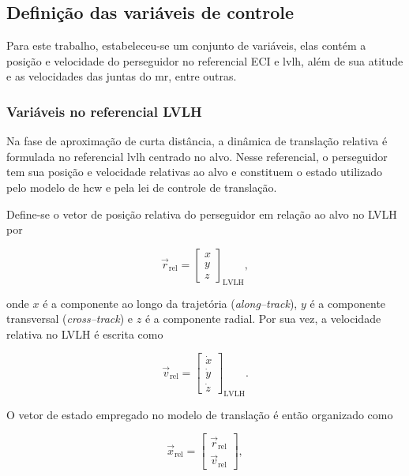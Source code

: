 \subsection{Definição das variáveis de controle}
\label{sec:var_controle}

Para este trabalho, estabeleceu-se um conjunto de variáveis, elas contém a posição e velocidade do perseguidor no referencial ECI e \gls{lvlh}, além de sua atitude e as velocidades das juntas do \gls{mr}, entre outras.

\subsubsection{Variáveis no referencial LVLH}
\label{sec:var_ref_lvlh}

Na fase de aproximação de curta distância, a dinâmica de translação relativa é formulada no referencial \gls{lvlh} centrado no alvo.
Nesse referencial, o perseguidor tem sua posição e velocidade relativas ao alvo e constituem o estado utilizado pelo modelo de \gls{hcw} e pela lei de controle de translação.

Define-se o vetor de posição relativa do perseguidor em relação ao alvo no LVLH por

\begin{equation}
\vec r_{\text{rel}}
=
\begin{bmatrix}
x \\[2pt] y \\[2pt] z
\end{bmatrix}_{\text{LVLH}},
\end{equation}

onde $x$ é a componente ao longo da trajetória (\emph{along--track}), $y$ é a componente transversal (\emph{cross--track}) e $z$ é a componente radial.
Por sua vez, a velocidade relativa no LVLH é escrita como

\begin{equation}
\vec v_{\text{rel}}
=
\begin{bmatrix}
\dot x \\[2pt] \dot y \\[2pt] \dot z
\end{bmatrix}_{\text{LVLH}}.
\end{equation}

O vetor de estado empregado no modelo de translação é então organizado como

\begin{equation}
\vec x_{\text{rel}}
=
\begin{bmatrix}
\vec r_{\text{rel}} \\[2pt]
\vec v_{\text{rel}}
\end{bmatrix},
\end{equation}

